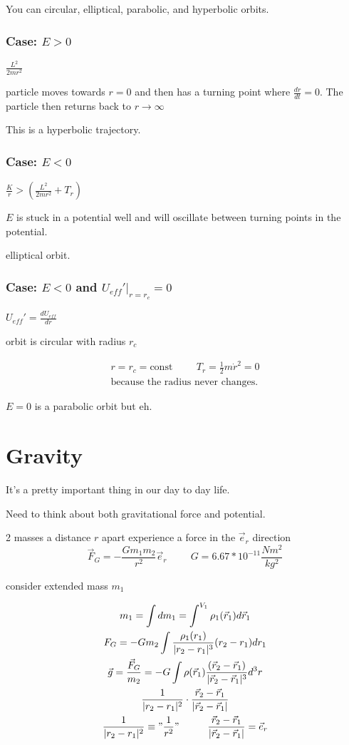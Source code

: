 \documentclass[fleqn]{report}
\newcommand{\hp}{\hspace{1cm}}
\newcommand{\const}{\textrm{const}}
\newcommand{\equations} [1] {
\begin{gather*}
#1
\end{gather*}
}
\begin{document}
You can circular, elliptical, parabolic, and hyperbolic orbits. 

\subsection{Case: $E > 0$}


$\frac{L^2}{2 m r^2}$

particle moves towards $r = 0$ and then has a turning point where $\frac{dr}{dt} = 0$. The particle then returns back to $r \to \infty$

This is a hyperbolic trajectory. 


\subsection{Case: $E < 0$}
$\frac{K}{r} > (\frac{L^2}{2 m r^2} + T_r)$

$E$ is stuck in a potential well and will oscillate between turning points in the potential. 

elliptical orbit. 

\subsection{Case: $E < 0$ and $U_{eff}' \Big|_{r = r_c} = 0$}
$U_{eff}' = \frac{dU_{eff}}{dr}$

orbit is circular with radius $r_c$

\equations{
    r = r_c = \const \hp 
    T_r = \frac{1}{2} m \dot r^2 = 0
    \\
    \textrm{because the radius never changes.}
}

$E = 0$ is a parabolic orbit but eh.


\chapter{Gravity}
It's a pretty important thing in our day to day life. 

Need to think about both gravitational force and potential. 

2 masses a distance $r$ apart experience a force in the $\vec e_r$ direction
\[
\vec F_G = - \frac{G m_1 m_2}{r^2} \vec e_r
\hp G = 6.67 * 10^{-11} \frac{N m^2}{kg^2}
\]

consider extended mass $m_1$
\equations{
    m_1 = \int dm_1 = \int^{V_1} \rho_1 (\vec r_1) d \vec r_1
    \\
    F_G = -Gm_2 \int \frac{\rho_1 (r_1)}{|r_2 - r_1|^3}(r_2 - r_1) dr_1
    \\
    \vec g = \frac{\vec F_G}{m_2} = 
    -G \int \rho (\vec r_1) 
    \frac{(\vec r_2 - \vec r_1)}{|\vec r_2 - \vec r_1|^3} d^3 r
    \\
    \frac{1}{|r_2 - r_1|^2} \cdot \frac{\vec r_2 - \vec r_1}{|\vec r_2 - \vec r_1|}
    \\
    \frac{1}{|r_2 - r_1|^2} \equiv "\frac{1}{r^2}"
    \hp  \frac{\vec r_2 - \vec r_1}{|\vec r_2 - \vec r_1|} = \vec e_r
}
\end{document}
